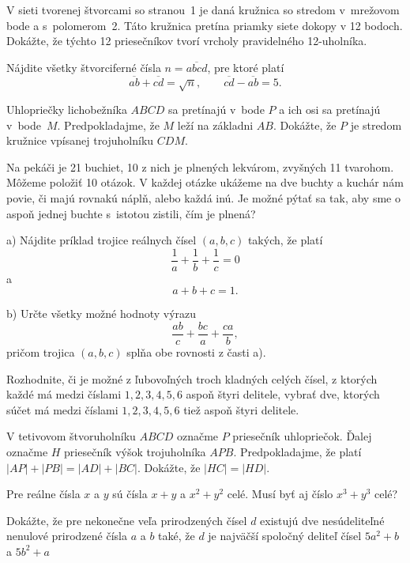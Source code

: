 {%
V sieti tvorenej štvorcami so stranou~1 je daná kružnica so stredom v~mrežovom bode a s~polomerom~2. Táto kružnica pretína priamky siete dokopy v 12 bodoch. Dokážte, že týchto 12 priesečníkov tvorí vrcholy pravidelného 12-uholníka.
%
}

{%
Nájdite všetky štvorciferné čísla $n=\overline{abcd}$, pre ktoré platí
$$
\overline{ab}+\overline{cd}=\sqrt{n}, \qquad \overline{cd}-\overline{ab}=5.
$$
}

{%
Uhlopriečky lichobežníka $ABCD$ sa pretínajú v~bode $P$ a ich osi sa pretínajú v~bode~$M$. Predpokladajme, že $M$ leží na základni $AB$. Dokážte, že $P$ je stredom kružnice vpísanej trojuholníku $CDM$.
%
}

{%
Na pekáči je 21 buchiet, 10 z nich je plnených lekvárom, zvyšných 11 tvarohom. Môžeme položiť 10 otázok. V každej otázke ukážeme na dve buchty a kuchár nám povie, či majú rovnakú náplň, alebo každá inú. Je možné pýtať sa tak, aby sme o aspoň jednej buchte s~istotou zistili, čím je plnená?
}

{%
\item{a)} Nájdite príklad trojice reálnych čísel $(a,b,c)$ takých, že platí
$$
\frac{1}{a}+\frac{1}{b}+\frac{1}{c}=0
$$
a
$$
a+b+c=1.
$$
\item{b)} Určte všetky možné hodnoty výrazu
$$
\frac{ab}{c}+\frac{bc}{a}+\frac{ca}{b},
$$
pričom trojica $(a,b,c)$ splňa obe rovnosti z časti a).}

{%
Rozhodnite, či je možné z ľubovoľných troch kladných celých čísel, z ktorých každé má medzi číslami $1,2,3,4,5,6$ aspoň štyri delitele, vybrať dve, ktorých súčet má medzi číslami $1,2,3,4,5,6$ tiež aspoň štyri delitele.}

{%
V tetivovom štvoruholníku $ABCD$ označme $P$ priesečník uhlopriečok. Ďalej označme $H$ priesečník výšok trojuholníka $APB$. Predpokladajme, že platí $|AP|+|PB|=|AD|+|BC|$. Dokážte, že $|HC|=|HD|$.}

{%
Pre reálne čísla $x$ a $y$ sú čísla $x + y$ a $x^2 + y^2$ celé. Musí byť aj číslo $x^3 + y^3$ celé?}

{%
Dokážte, že pre nekonečne veľa prirodzených čísel $d$ existujú dve nesúdeliteľné nenulové prirodzené čísla $a$ a $b$ také, že $d$ je najväčší spoločný deliteľ čísel $5a^2 + b$ a $5b^2 + a$}

